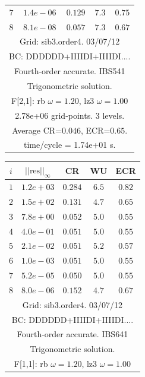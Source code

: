 \begin{table}[hbt]
\begin{center}
{\begin{tabular}{|c|c|c|c|c|}
 $ 7$  & $ 1.4e-06$ & $0.129$ & $ 7.3$ & $0.75$ \\ 
 $ 8$  & $ 8.1e-08$ & $0.057$ & $ 7.3$ & $0.67$ \\ 
\hline 
\multicolumn{5}{|c|}{Grid: sib3.order4. 03/07/12}  \\
\multicolumn{5}{|c|}{BC: DDDDDD+IIIIDI+IIIIDI....}  \\
\multicolumn{5}{|c|}{Fourth-order accurate. IBS541}  \\
\multicolumn{5}{|c|}{Trigonometric solution.}  \\
\multicolumn{5}{|c|}{F[2,1]: rb $\omega=1.20$, lz3 $\omega=1.00$}  \\
\multicolumn{5}{|c|}{2.78e+06 grid-points. 3 levels.}  \\
\multicolumn{5}{|c|}{Average CR=$0.046$, ECR=$0.65$.}  \\
\multicolumn{5}{|c|}{time/cycle = 1.74e+01 s.}  \\
\hline 
\end{tabular}
\begin{tabular}{|c|c|c|c|c|} \hline 
 $i$   & $\vert\vert\mbox{res}\vert\vert_\infty$  &  CR     &  WU    & ECR  \\   \hline 
 $ 1$  & $ 1.2e+03$ & $0.284$ & $ 6.5$ & $0.82$ \\ 
 $ 2$  & $ 1.5e+02$ & $0.131$ & $ 4.7$ & $0.65$ \\ 
 $ 3$  & $ 7.8e+00$ & $0.052$ & $ 5.0$ & $0.55$ \\ 
 $ 4$  & $ 4.0e-01$ & $0.051$ & $ 5.0$ & $0.55$ \\ 
 $ 5$  & $ 2.1e-02$ & $0.051$ & $ 5.2$ & $0.57$ \\ 
 $ 6$  & $ 1.0e-03$ & $0.051$ & $ 5.0$ & $0.55$ \\ 
 $ 7$  & $ 5.2e-05$ & $0.050$ & $ 5.0$ & $0.55$ \\ 
 $ 8$  & $ 8.0e-06$ & $0.152$ & $ 4.7$ & $0.67$ \\ 
\hline 
\multicolumn{5}{|c|}{Grid: sib3.order4. 03/07/12}  \\
\multicolumn{5}{|c|}{BC: DDDDDD+IIIIDI+IIIIDI....}  \\
\multicolumn{5}{|c|}{Fourth-order accurate. IBS641}  \\
\multicolumn{5}{|c|}{Trigonometric solution.}  \\
\multicolumn{5}{|c|}{F[1,1]: rb $\omega=1.20$, lz3 $\omega=1.00$}  \\

\end{tabular}}
\end{center}
\end{table}
